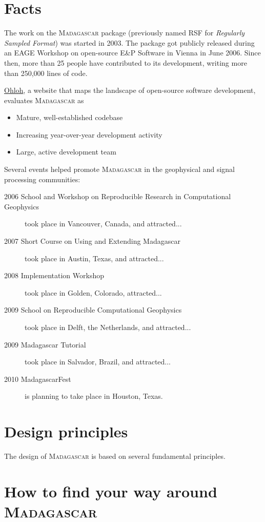 \section{Facts}

The work on the \textsc{Madagascar} package (previously named RSF for \emph{Regularly
Sampled Format}) was started in 2003.  The package got
publicly released during an EAGE Workshop on open-source E\&P Software
in Vienna in June 2006. Since then, more than 25 people have
contributed to its development, writing more than 250,000 lines of code.

\href{http://www.ohloh.net/}{Ohloh}, a website that maps the landscape
of open-source software development, evaluates \textsc{Madagascar} as
\begin{itemize}
\item Mature, well-established codebase
\item Increasing year-over-year development activity
\item Large, active development team 
\end{itemize}

Several events helped promote \textsc{Madagascar} in the geophysical
and signal processing communities:
\begin{description}
\item[2006 School and Workshop on Reproducible Research in
  Computational Geophysics] took place in Vancouver, Canada, and
  attracted...
\item[2007 Short Course on Using and Extending Madagascar] took place
  in Austin, Texas, and attracted...
\item[2008 Implementation Workshop] took place in Golden, Colorado, attracted...
\item[2009 School on Reproducible Computational Geophysics] took place
  in Delft, the Netherlands, and attracted...
\item[2009 Madagascar Tutorial] took place in Salvador, Brazil, and attracted...
\item[2010 MadagascarFest] is planning to take place in Houston, Texas.
\end{description}

\section{Design principles}

The design of \textsc{Madagascar} is based on several fundamental principles.

\section{How to find your way around \textsc{Madagascar}}

